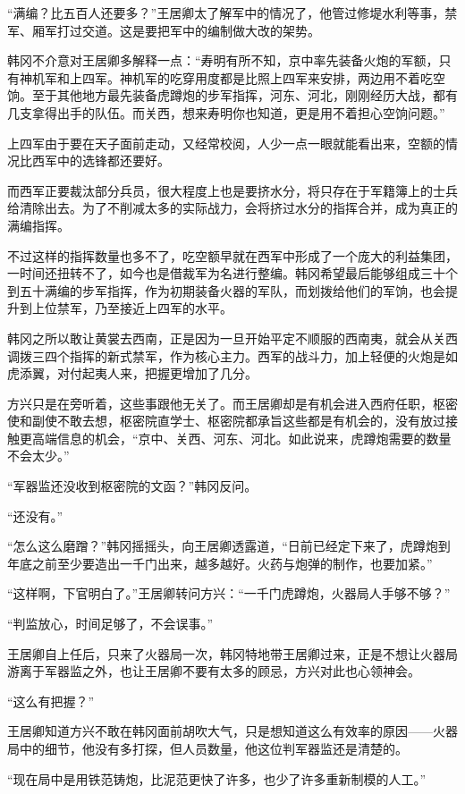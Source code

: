 “满编？比五百人还要多？”王居卿太了解军中的情况了，他管过修堤水利等事，禁军、厢军打过交道。这是要把军中的编制做大改的架势。

韩冈不介意对王居卿多解释一点：“寿明有所不知，京中率先装备火炮的军额，只有神机军和上四军。神机军的吃穿用度都是比照上四军来安排，两边用不着吃空饷。至于其他地方最先装备虎蹲炮的步军指挥，河东、河北，刚刚经历大战，都有几支拿得出手的队伍。而关西，想来寿明你也知道，更是用不着担心空饷问题。”

上四军由于要在天子面前走动，又经常校阅，人少一点一眼就能看出来，空额的情况比西军中的选锋都还要好。

而西军正要裁汰部分兵员，很大程度上也是要挤水分，将只存在于军籍簿上的士兵给清除出去。为了不削减太多的实际战力，会将挤过水分的指挥合并，成为真正的满编指挥。

不过这样的指挥数量也多不了，吃空额早就在西军中形成了一个庞大的利益集团，一时间还扭转不了，如今也是借裁军为名进行整编。韩冈希望最后能够组成三十个到五十满编的步军指挥，作为初期装备火器的军队，而划拨给他们的军饷，也会提升到上位禁军，乃至接近上四军的水平。

韩冈之所以敢让黄裳去西南，正是因为一旦开始平定不顺服的西南夷，就会从关西调拨三四个指挥的新式禁军，作为核心主力。西军的战斗力，加上轻便的火炮是如虎添翼，对付起夷人来，把握更增加了几分。

方兴只是在旁听着，这些事跟他无关了。而王居卿却是有机会进入西府任职，枢密使和副使不敢去想，枢密院直学士、枢密院都承旨这些都是有机会的，没有放过接触更高端信息的机会，“京中、关西、河东、河北。如此说来，虎蹲炮需要的数量不会太少。”

“军器监还没收到枢密院的文函？”韩冈反问。

“还没有。”

“怎么这么磨蹭？”韩冈摇摇头，向王居卿透露道，“日前已经定下来了，虎蹲炮到年底之前至少要造出一千门出来，越多越好。火药与炮弹的制作，也要加紧。”

“这样啊，下官明白了。”王居卿转问方兴：“一千门虎蹲炮，火器局人手够不够？”

“判监放心，时间足够了，不会误事。”

王居卿自上任后，只来了火器局一次，韩冈特地带王居卿过来，正是不想让火器局游离于军器监之外，也让王居卿不要有太多的顾忌，方兴对此也心领神会。

“这么有把握？”

王居卿知道方兴不敢在韩冈面前胡吹大气，只是想知道这么有效率的原因——火器局中的细节，他没有多打探，但人员数量，他这位判军器监还是清楚的。

“现在局中是用铁范铸炮，比泥范更快了许多，也少了许多重新制模的人工。”

